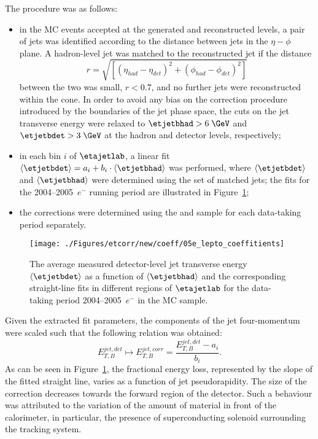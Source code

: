 The procedure was as follows:
\begin{itemize}
 \item in the MC events accepted at the generated and reconstructed levels, a pair of jets was identified according to the distance between jets in the $\eta-\phi$ plane. A hadron-level jet was matched to the reconstructed jet if the distance 
\begin{equation}
r=\sqrt{\left[\left(\eta_{had}-\eta_{det}\right)^2 + \left(\phi_{had}-\phi_{det}\right)^2\right]}
\end{equation}
between the two was small, $r<0.7$, and no further jets were reconstructed within the cone.
In order to avoid any bias on the correction procedure introduced by the boundaries of the jet phase space, the cuts on the jet transverse energy were relaxed to $\etjetbhad>6\;\GeV$ and $\etjetbdet>3\;\GeV$ at the hadron and detector levels, respectively;
 \item in each bin $i$ of $\etajetlab$, a linear fit $\left\langle\etjetbdet\right\rangle = a_i + b_i\cdot\left\langle\etjetbhad\right\rangle$ was performed, where $\left\langle\etjetbdet\right\rangle$ and $\left\langle\etjetbhad\right\rangle$ were determined using the set of matched jets; the fits for the 2004--2005~$e^-$ running period are illustrated in Figure~\ref{fig:05e_lepto_coeffitients};
 \item the corrections were determined using the \ariadne and \lepto sample for each data-taking period separately. 
\end{itemize}
\begin{figure}[p]
\centering
\texttt{[image: ./Figures/etcorr/new/coeff/05e\_lepto\_coeffitients]}
\caption{The average measured detector-level jet transverse energy $\left\langle\etjetbdet\right\rangle$ as a function of $\left\langle\etjetbhad\right\rangle$ and the corresponding straight-line fits in different regions of $\etajetlab$ for the data-taking period 2004--2005~$e^-$ in the \lepto MC sample.}
\label{fig:05e_lepto_coeffitients}
\end{figure}

Given the extracted fit parameters, the components of the jet four-mo\-me\-ntum were scaled such that the following relation was obtained:
 \begin{equation}
  E_{T,B}^{jet,det} \mapsto E_{T,B}^{jet,corr} = \frac{E_{T,B}^{jet,det} - a_i}{b_i}.
 \end{equation}
As can be seen in Figure~\ref{fig:05e_lepto_coeffitients}, the fractional energy loss, represented by the slope of the fitted straight line, varies as a function of jet pseudorapidity. The size of the correction decreases towards the forward region of the detector. Such a behaviour was attributed to the variation of the amount of material in front of the calorimeter, in particular, the presence of superconducting solenoid surrounding the tracking system. 

